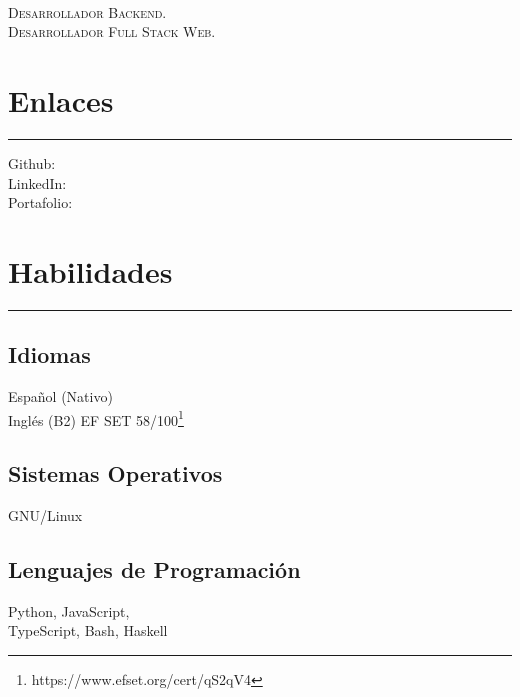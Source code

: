 \documentclass[]{rahulworld-resume}
\begin{document}
%
%

\begin{minipage}[t]{0.33\textwidth}
    \begin{large}
        \\
    \end{large}

    \textsc{Desarrollador Backend.}\\
    \textsc{Desarrollador Full Stack Web.}


    \section{Enlaces}
    \noindent\rule{5cm}{0.4pt}

    Github: \href{https://github.com/jamerrq}{} \\
    LinkedIn: \href{https://www.linkedin.com/in/jamerrq}{} \\
    Portafolio: \href{https://my-portfolio-jamerrq.netlify.app/}{}
    \section{Habilidades}
    \noindent\rule{5cm}{0.4pt}
    \subsection{Idiomas}
    Español (Nativo)\\
    Inglés (B2) EF SET 58/100\footnote{https://www.efset.org/cert/qS2qV4}\\
    \vspace{1pt}
    \subsection{Sistemas Operativos}
    GNU/Linux\\
    \vspace{1pt}
    \subsection{Lenguajes de Programación}
    Python, JavaScript,\\
    TypeScript, Bash, Haskell\\
    \vspace{1pt}

\end{minipage}
\end{document}
